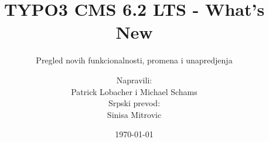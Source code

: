 %

%
%

\documentclass[t]{beamer}

\beamertemplatenavigationsymbolsempty

{
	\usetheme{typo3slides}
}

\title{TYPO3 CMS 6.2 LTS - What's New}
\subtitle{Pregled novih funkcionalnosti, promena i unapredjenja}
\author{
	\centerline{Napravili:}
	\centerline{Patrick Lobacher i Michael Schams}
	\vspace{0.4cm}
	\centerline{Srpski prevod:}
	Sinisa Mitrovic
}
\date{\today}



\sharefont


\begingroup
	[default]
	\begin{frame}
		\titlepage
	\end{frame}
\endgroup



\section*{TYPO3 CMS 6.2 LTS - What's New}
\begin{frame}[fragile]
	\frametitle{Pregled}
	\framesubtitle{Pregled}

	\begin{multicols}{2}
		\tableofcontents
	\end{multicols}

\end{frame}

